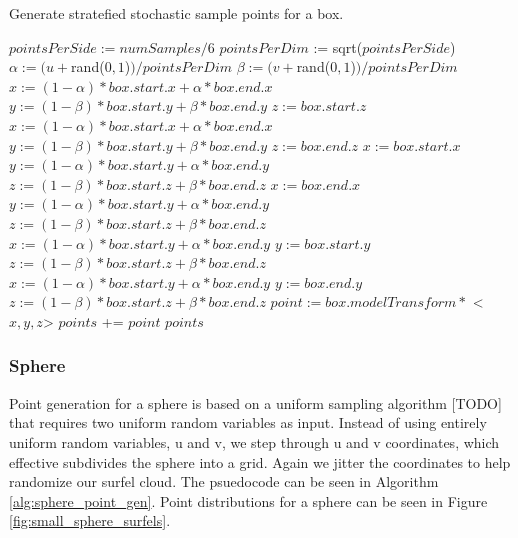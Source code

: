 \begin{algorithm}
\captionfont
\caption[Box point generation]{Generate stratefied stochastic sample points for a box.}
\label{alg:box_point_gen}
{\fontsize{10}{9}\selectfont
\begin{algorithmic}
      \State $pointsPerSide := numSamples / 6$
      \State $pointsPerDim$ := sqrt($pointsPerSide$)
               \State $\alpha := (u + $rand($0,1$)$) / pointsPerDim$
               \State $\beta := (v + $rand($0,1$)$) / pointsPerDim$
                  \State $x := (1-\alpha) * box.start.x + \alpha * box.end.x$
                  \State $y := (1-\beta) * box.start.y + \beta * box.end.y$
                  \State $z := box.start.z$
                  \State $x := (1-\alpha) * box.start.x + \alpha * box.end.x$
                  \State $y := (1-\beta) * box.start.y + \beta * box.end.y$
                  \State $z := box.end.z$
                  \State $x := box.start.x$
                  \State $y := (1-\alpha) * box.start.y + \alpha * box.end.y$
                  \State $z := (1-\beta) * box.start.z + \beta * box.end.z$
                  \State $x := box.end.x$
                  \State $y := (1-\alpha) * box.start.y + \alpha * box.end.y$
                  \State $z := (1-\beta) * box.start.z + \beta * box.end.z$
                  \State $x := (1-\alpha) * box.start.y + \alpha * box.end.y$
                  \State $y := box.start.y$
                  \State $z := (1-\beta) * box.start.z + \beta * box.end.z$
                  \State $x := (1-\alpha) * box.start.y + \alpha * box.end.y$
                  \State $y := box.end.y$
                  \State $z := (1-\beta) * box.start.z + \beta * box.end.z$
               \EndIf
               \State $point := box.modelTransform *$ \textless$x, y, z$\textgreater
               \State $points$ += $point$
            \EndFor
         \EndFor
      \EndFor
      \State \Return $points$
   \EndFunction
\end{algorithmic}
}
\end{algorithm}

\subsubsection{Sphere}
\label{sec:sphere_point_gen}
Point generation for a sphere is based on a uniform sampling algorithm [TODO] that requires two uniform random variables as input. Instead of using entirely uniform random variables, u and v, we step through u and v coordinates, which effective subdivides the sphere into a grid. Again we jitter the coordinates to help randomize our surfel cloud.
The psuedocode can be seen in Algorithm \ref{alg:sphere_point_gen}.
Point distributions for a sphere can be seen in Figure \ref{fig:small_sphere_surfels}.

